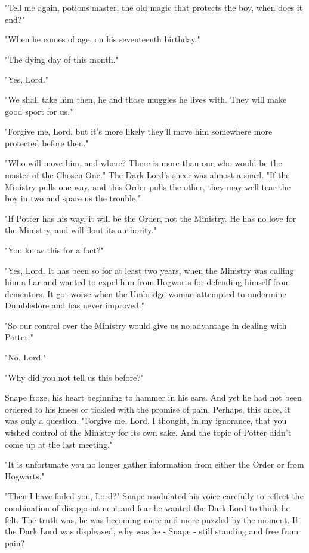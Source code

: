 \documentclass[a4paper,11pt]{article}
\begin{document}
"Tell me again, potions master, the old magic that protects the boy, when does it end?"

"When he comes of age, on his seventeenth birthday."

"The dying day of this month."

"Yes, Lord."

"We shall take him then, he and those muggles he lives with. They will make good sport for us."

"Forgive me, Lord, but it's more likely they'll move him somewhere more protected before then."

"Who will move him, and where? There is more than one who would be the master of the Chosen One." The Dark Lord's sneer was almost a snarl. "If the Ministry pulls one way, and this Order pulls the other, they may well tear the boy in two and spare us the trouble."

"If Potter has his way, it will be the Order, not the Ministry. He has no love for the Ministry, and will flout its authority."

"You know this for a fact?"

"Yes, Lord. It has been so for at least two years, when the Ministry was calling him a liar and wanted to expel him from Hogwarts for defending himself from dementors. It got worse when the Umbridge woman attempted to undermine Dumbledore and has never improved."

"So our control over the Ministry would give us no advantage in dealing with Potter."

"No, Lord."

"Why did you not tell us this before?"

Snape froze, his heart beginning to hammer in his ears. And yet he had not been ordered to his knees or tickled with the promise of pain. Perhaps, this once, it was only a question. "Forgive me, Lord. I thought, in my ignorance, that you wished control of the Ministry for its own sake. And the topic of Potter didn't come up at the last meeting."

"It is unfortunate you no longer gather information from either the Order or from Hogwarts."

"Then I have failed you, Lord?" Snape modulated his voice carefully to reflect the combination of disappointment and fear he wanted the Dark Lord to think he felt. The truth was, he was becoming more and more puzzled by the moment. If the Dark Lord was displeased, why was he - Snape - still standing and free from pain?
\end{document}
